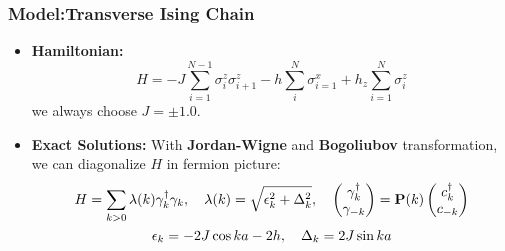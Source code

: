 \documentclass{beamer}
\begin{document}
\begin{frame}
	\frametitle{Model:Transverse Ising Chain}
	\begin{itemize}
		\item \textbf{Hamiltonian:} 
		\begin{equation}
			H = -J\sum_{i=1}^{N-1}\sigma_i^z \sigma_{i+1}^z -h\sum_i^N\sigma_{i=1}^x + h_z\sum_{i=1}^N\sigma_i^z
		\end{equation}
		we always choose $J = \pm 1.0$.
		\item \textbf{Exact Solutions:} With \textbf{Jordan-Wigne} and \textbf{Bogoliubov} transformation, we can diagonalize $H$ in fermion picture:
		\begin{gather}
			H = \sum_{k>0}\lambda(k)\gamma_k^\dagger \gamma_k,\quad \lambda(k) = \sqrt{\epsilon_k^2 + \Delta_k^2},\quad \begin{pmatrix}
				\gamma_k^\dagger\\\gamma_{-k}
				\end{pmatrix} = \vb{P}(k) \begin{pmatrix}
					c_k^\dagger\\c_{-k}
					\end{pmatrix}\\
			\epsilon_k = -2J\cos ka-2h,\quad \Delta_k = 2J\sin ka
		\end{gather}
	\end{itemize}
\end{frame}
\end{document}
